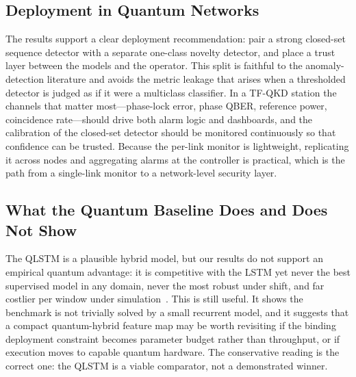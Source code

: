 \documentclass[runningheads]{llncs}
\begin{document}
\subsection{Deployment in Quantum Networks}
The results support a clear deployment recommendation: pair a strong closed-set sequence detector with a separate one-class novelty detector, and place a trust layer between the models and the operator. This split is faithful to the anomaly-detection literature and avoids the metric leakage that arises when a thresholded detector is judged as if it were a multiclass classifier. In a TF-QKD station the channels that matter most---phase-lock error, phase QBER, reference power, coincidence rate---should drive both alarm logic and dashboards, and the calibration of the closed-set detector should be monitored continuously so that confidence can be trusted. Because the per-link monitor is lightweight, replicating it across nodes and aggregating alarms at the controller is practical, which is the path from a single-link monitor to a network-level security layer.

\subsection{What the Quantum Baseline Does and Does Not Show}
The QLSTM is a plausible hybrid model, but our results do not support an empirical quantum advantage: it is competitive with the LSTM yet never the best supervised model in any domain, never the most robust under shift, and far costlier per window under simulation~\cite{qlstm,chen,mcclean2018barren,cerezo2021variational,bergholm2018pennylane,larocca2024review,gilfuster2024generalization,haug2024qfim}. This is still useful. It shows the benchmark is not trivially solved by a small recurrent model, and it suggests that a compact quantum-hybrid feature map may be worth revisiting if the binding deployment constraint becomes parameter budget rather than throughput, or if execution moves to capable quantum hardware. The conservative reading is the correct one: the QLSTM is a viable comparator, not a demonstrated winner.
\end{document}
